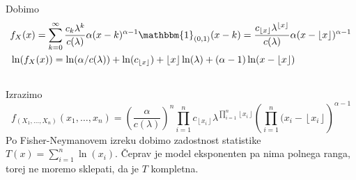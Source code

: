 \documentclass[ letterpaper, titlepage, fleqn]{article}
\newcommand{\ind}{\mathbbm{1}}
\providecommand{\floor}[1]{\left \lfloor #1 \right \rfloor }
\begin{document}
\subsection{}
Dobimo
\begin{equation*}
\begin{aligned}
&f_X(x) = \sum_{k=0}^\infty \frac{c_k\lambda^k}{c(\lambda)}  \alpha (x-k)^{\alpha-1} \ind_{(0,1)}(x-k) 
= \frac{c_{\floor{x}} \lambda^{\floor{x}}}{c(\lambda)} \alpha (x-\floor{x})^{\alpha-1} \\
&\ln(f_X(x)) = \ln(\alpha/c(\lambda)) + \ln(c_{\floor{x}}) + \floor{x}\ln(\lambda) + (\alpha-1)\ln(x - \floor{x})
\end{aligned}
\end{equation*}

\subsection{}
Izrazimo
\begin{equation*}
f_{(X_1, \dots, X_n)}(x_1, \dots, x_n) = \left(\frac{\alpha}{c(\lambda)}\right)^n \prod_{i=1}^n c_{\floor{x_i}}
\lambda^{\prod_{i=1}^n \floor{x_i}} \left(\prod_{i=1}^n(x_i - \floor{x_i}\right)^{\alpha-1}
\end{equation*}
Po Fisher-Neymanovem izreku dobimo zadostnost statistike $T(x) = \sum_{i=1}^n \ln(x_i)$. Čeprav je model eksponenten pa nima polnega ranga, torej ne moremo sklepati, da je $T$ kompletna.
\end{document}
